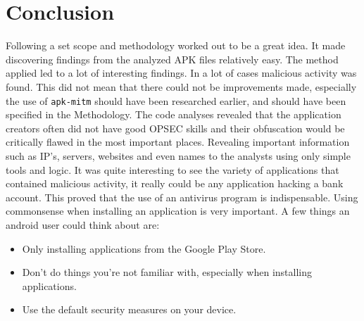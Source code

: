 \section{Conclusion}

Following a set scope and methodology worked out to be a great idea. It made discovering findings from the analyzed APK files relatively easy.
The method applied led to a lot of interesting findings. 
In a lot of cases malicious activity was found. 
This did not mean that there could not be improvements made, especially the use of \texttt{apk-mitm} should have been researched earlier, and should have been specified in the Methodology.
The code analyses revealed that the application creators often did not have good OPSEC skills and their obfuscation would be critically flawed in the most important places.
Revealing important information such as IP's, servers, websites and even names to the analysts using only simple tools and logic.
It was quite interesting to see the variety of applications that contained malicious activity, it really could be any application hacking a bank account.
This proved that the use of an antivirus program is indispensable.
Using commonsense when installing an application is very important.
A few things an android user could think about are:

\begin{itemize}
    \item Only installing applications from the Google Play Store.
    \item Don't do things you're not familiar with, especially when installing applications.
    \item Use the default security measures on your device.
\end{itemize}


